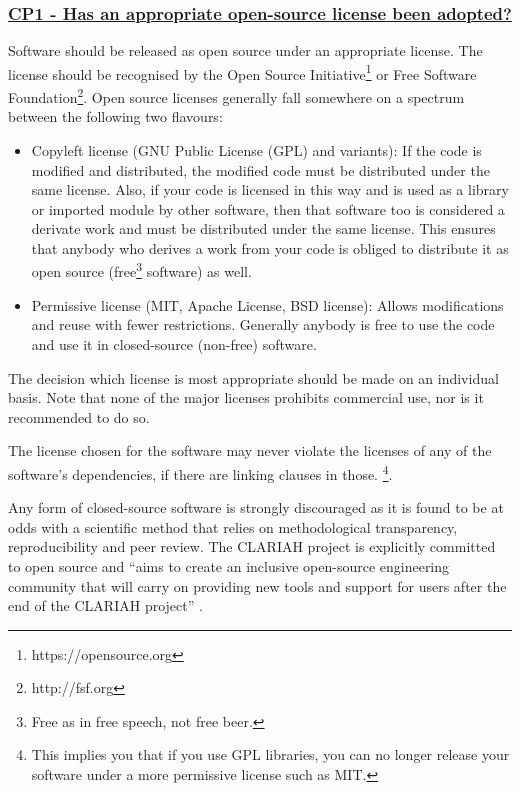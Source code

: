 \documentclass[a4paper,11pt]{article}
\newcommand{\criterion}[2]{\subsubsection*{\underline{#1 - #2}}\label{id:#1}}
\newcommand\CheckTable{%
  \begin{tabular}{ccccc}
    No & Minimal & Adequate & Good & Perfect \\
    0 & 1 & 2 & 3 & 4 \\
    \hline
    $\square$ & $\square$ & $\square$ & $\square$ & $\square$ \\
  \end{tabular}%
}
\begin{document}
\newcommand{\cpOneID}{CP1}
\newcommand{\cpOneText}{Has an appropriate open-source license been adopted?}
\criterion{\cpOneID}{\cpOneText}

Software should be released as open source under an appropriate license. The
license should be recognised by the Open Source Initiative\footnote{https://opensource.org} or Free Software
Foundation\footnote{http://fsf.org}. Open source licenses generally fall somewhere on a spectrum between the following two flavours:

\begin{itemize}
 \item Copyleft license (GNU Public License (GPL) and variants): If the code is modified and distributed, the modified code must be distributed under the same license. Also, if your code is licensed in this way and is used as a library or imported module by other software, then that software too is considered a derivate work and must be distributed under the same license. This ensures that anybody who derives a work from your code is obliged to distribute it as open source (free\footnote{Free as in free speech, not free beer.} software) as well.
 \item Permissive license (MIT, Apache License, BSD license): Allows modifications and reuse with fewer restrictions. Generally anybody is free to use the code and use it in closed-source (non-free) software.
\end{itemize}

The decision which license is most appropriate should be made on an individual
basis. Note that none of the major licenses prohibits commercial use, nor is it
recommended to do so.

The license chosen for the software may never violate the licenses of any of
the software's dependencies, if there are linking clauses in those. \footnote{This implies you that if you use GPL libraries, you can no longer release your software under a more permissive license such as MIT.}.

Any form of closed-source software is strongly discouraged as it is found to be
at odds with a scientific method that relies on methodological transparency,
reproducibility and peer review. The CLARIAH project is explicitly committed to
open source and ``aims to create an inclusive open-source engineering community
that will carry on providing new tools and support for users after the end of
the CLARIAH project'' \citep{CLARIAHTECHPLAN1}.

\end{document}

